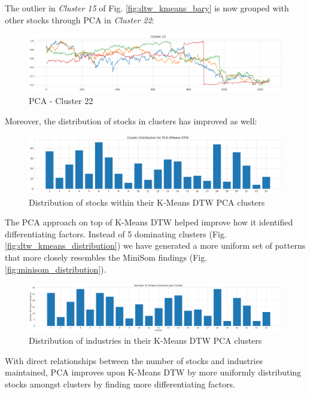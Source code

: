 \documentclass[11pt]{article}
\begin{document}
The outlier in \textit{Cluster 15} of Fig. \ref{fig:dtw_kmeans_bary} is now grouped with other stocks through PCA in \textit{Cluster 22}:

\begin{figure}[H]
\centering
\includegraphics[width=12cm]{img/pca-cluster22.png} 
\caption{PCA - Cluster 22}
\end{figure}

Moreover, the distribution of stocks in clusters has improved as well:

\begin{figure}[H]
\centering
\includegraphics[width=12cm]{img/dtw-kmeans-pca-distribution.png} 
\caption{Distribution of stocks within their K-Means DTW PCA clusters}
\label{fig:dtw_kmeans_pca_distribution}
\end{figure}

The PCA approach on top of K-Means DTW helped improve how it identified differentiating factors. Instead of 5 dominating clusters (Fig. \ref{fig:dtw_kmeans_distribution}) we have generated a more uniform set of patterns that more closely resembles the MiniSom findings (Fig. \ref{fig:minisom_distribution}).

\begin{figure}[H]
\centering
\includegraphics[width=12cm]{img/dtw-pca-industries.png} 
\caption{Distribution of industries in their K-Means DTW PCA clusters}
\label{fig:dtw_pca_industries}
\end{figure}

With direct relationships between the number of stocks and industries maintained, PCA improves upon K-Means DTW by more uniformly distributing stocks amongst clusters by finding more differentiating factors.
\end{document}
